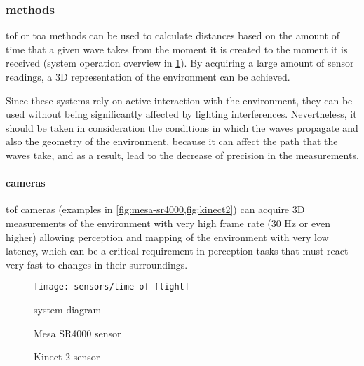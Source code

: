 \subsubsection{ methods}\label{sec:tof-methods}

\gls{tof} or \gls{toa} methods can be used to calculate distances based on the amount of time that a given wave takes from the moment it is created to the moment it is received (system operation overview in \cref{fig:time-of-flight}). By acquiring a large amount of sensor readings, a 3D representation of the environment can be achieved.

Since these systems rely on active interaction with the environment, they can be used without being significantly affected by lighting interferences. Nevertheless, it should be taken in consideration the conditions in which the waves propagate and also the geometry of the environment, because it can affect the path that the waves take, and as a result, lead to the decrease of precision in the measurements.


\paragraph{ cameras}

\gls{tof} cameras (examples in \cref{fig:mesa-sr4000,fig:kinect2}) can acquire 3D measurements of the environment with very high frame rate (30 Hz or even higher) allowing perception and mapping of the environment with very low latency, which can be a critical requirement in perception tasks that must react very fast to changes in their surroundings.

\begin{figure}[H]
	\centering
	\texttt{[image: sensors/time-of-flight]}
	\caption[ system diagram]{ system diagram\protect\footnotemark}
	\label{fig:time-of-flight}
\end{figure}

\begin{figure}[H]
	\begin{floatrow}[2]
		{\caption[Mesa SR4000 sensor]{Mesa SR4000 sensor\protect\footnotemark}\label{fig:mesa-sr4000}}

		{\caption[Kinect 2 sensor]{Kinect 2 sensor\protect\footnotemark}\label{fig:kinect2}}
	\end{floatrow}
\end{figure}


